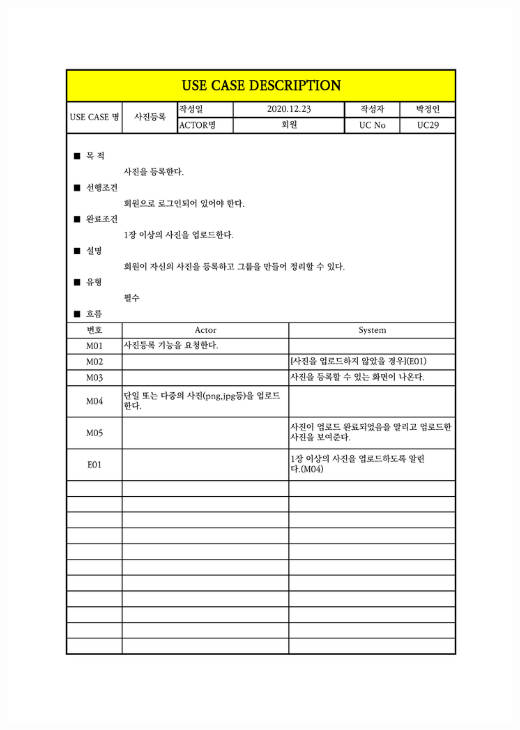 {{{{{{{{{{{{{{{{{{{{{{{{{{{{{{{\includegraphics[width=1.1\textwidth]{./Figure/Design/Display/usecase/029.pdf} \\
}}}}}}}}}}}}}}}}}}}}}}}}}}}}}}}
